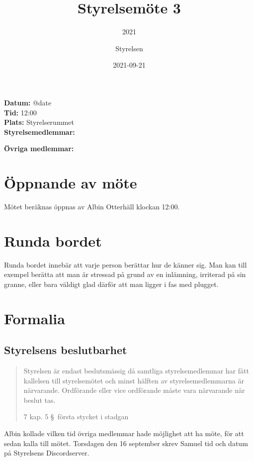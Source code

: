 \documentclass[protokoll]{dvd}
\begin{document}
\title{Styrelsemöte 3}
\subtitle{2021}
\author{Styrelsen}
\date{2021-09-21}

\textbf{Datum:} \csname @date\endcsname\\
\textbf{Tid:} 12:00\\
\textbf{Plats:} Styrelserummet\\
\textbf{Styrelsemedlemmar:}
\begin{närvarande_förtroendevalda}
\end{närvarande_förtroendevalda}
\textbf{Övriga medlemmar:}

\section{Öppnande av möte}

Mötet beräknas öppnas av Albin Otterhäll klockan 12:00.

\section{Runda bordet}

Runda bordet innebär att varje person berättar hur de känner sig.
Man kan till exempel berätta att man är stressad på grund av en inlämning, irriterad på sin granne, eller bara väldigt glad därför att man ligger i fas med plugget.

\section{Formalia}

\subsection{Styrelsens beslutbarhet}

\blockquote[7 kap. 5 \S~första stycket i stadgan][]{%
    Styrelsen är endast beslutsmässig då samtliga styrelsemedlemmar har fått kallelsen till styrelsemötet och minst hälften av styrelsemedlemmarna är närvarande.
    Ordförande eller vice ordförande måste vara närvarande när beslut tas.
}

Albin kollade vilken tid övriga medlemmar hade möjlighet att ha möte, för att sedan kalla till mötet.
Torsdagen den 16 september skrev Samuel tid och datum på Styrelsens Discordserver.
\end{document}
